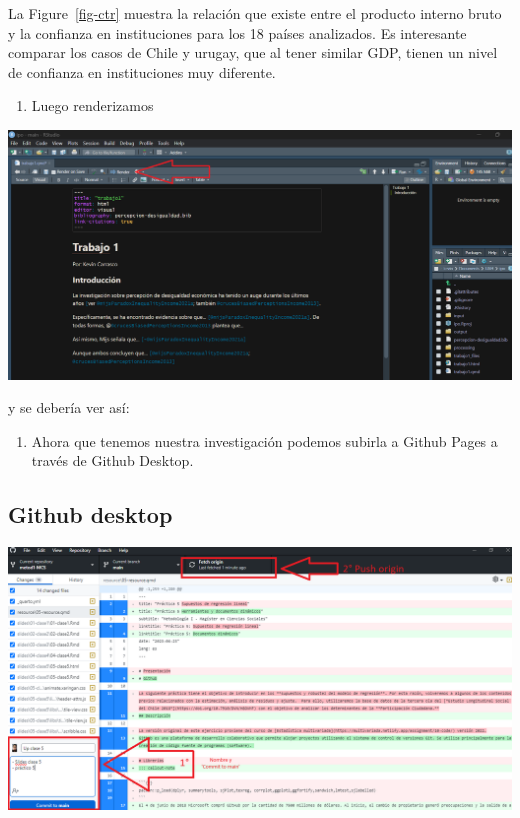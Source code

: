 \documentclass[
  letterpaper,
  DIV=11,
  numbers=noendperiod]{scrartcl}
\providecommand{\tightlist}{%
  \setlength{\itemsep}{0pt}\setlength{\parskip}{0pt}}\usepackage{longtable,booktabs,array}
\begin{document}
La Figure~\ref{fig-ctr} muestra la relación que existe entre el producto
interno bruto y la confianza en instituciones para los 18 países
analizados. Es interesante comparar los casos de Chile y urugay, que al
tener similar GDP, tienen un nivel de confianza en instituciones muy
diferente.

\begin{enumerate}
\def\labelenumi{\arabic{enumi}.}
\setcounter{enumi}{4}
\tightlist
\item
  Luego renderizamos
\end{enumerate}

\includegraphics{images/quarto4.png}

y se debería ver así:

\begin{enumerate}
\def\labelenumi{\arabic{enumi}.}
\setcounter{enumi}{5}
\tightlist
\item
  Ahora que tenemos nuestra investigación podemos subirla a Github Pages
  a través de Github Desktop.
\end{enumerate}

\subsection{Github desktop}\label{github-desktop-1}

\includegraphics{images/push-github.png}
\end{document}
